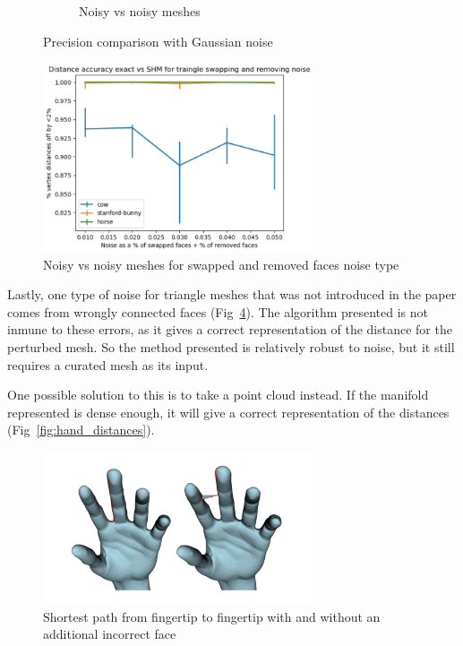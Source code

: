 \documentclass[sigconf]{acmart}
\begin{document}
\begin{figure}[htbp]
\begin{subfigure}[b]{0.23\textwidth}
    \caption{Noisy vs noisy meshes}
    \label{fig:noisy_vs_noisy}
  \end{subfigure}
  \caption{Precision comparison with Gaussian noise}
  \label{fig:original_vs_noisy_gaussian}
  \Description{}
\end{figure}

\begin{figure}
  \centering
  \includegraphics[width=8cm]{original_vs_original_swapped_and_removed_triangles.png}
  \caption{Noisy vs noisy meshes for swapped and removed faces noise type}
  \label{fig:noisy_vs_noisy_swapped_and_removed}
\end{figure}

Lastly, one type of noise for triangle meshes that was not introduced in the paper comes from
wrongly connected faces (Fig~\ref{fig:hands}). The algorithm presented is not inmune to these errors,
as it gives a correct representation of the distance for the perturbed mesh. So the method
presented is relatively robust to noise, but it still requires a curated mesh as its input. 

One possible solution to this is to take a point cloud instead. If the manifold represented is
dense enough, it will give a correct representation of the distances (Fig~\ref{fig:hand_distances}).

\begin{figure}
  \centering
  \includegraphics[width=8cm]{hands.png}
  \caption{Shortest path from fingertip to fingertip with and without an additional incorrect face}
  \label{fig:hands}
\end{figure}
\end{document}
